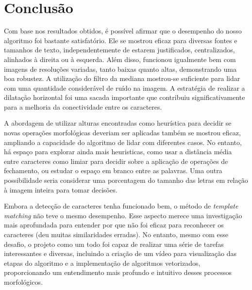 \documentclass[english, 
               brazil, 
               bsc] %
               {dcomp-abntex2}
\begin{document}
\chapter{Conclusão}

Com base nos resultados obtidos, é possível afirmar que o desempenho do nosso algoritmo foi bastante satisfatório. Ele se mostrou eficaz para diversas fontes e tamanhos de texto, independentemente de estarem justificados, centralizados, alinhados à direita ou à esquerda. Além disso, funcionou igualmente bem com imagens de resoluções variadas, tanto baixas quanto altas, demonstrando uma boa robustez. A utilização do filtro da mediana mostrou-se suficiente para lidar com uma quantidade considerável de ruído na imagem. A estratégia de realizar a dilatação horizontal foi uma sacada importante que contribuiu significativamente para a melhoria da conectividade entre os caracteres.

A abordagem de utilizar alturas encontradas como heurística para decidir se novas operações morfológicas deveriam ser aplicadas também se mostrou eficaz, ampliando a capacidade do algoritmo de lidar com diferentes casos. No entanto, há espaço para explorar ainda mais heuristicas, como usar a distância média entre caracteres como limiar para decidir sobre a aplicação de operações de fechamento, ou estudar o espaço em branco entre as palavras. Uma outra possibilidade seria considerar uma porcentagem do tamanho das letras em relação à imagem inteira para tomar decisões.

Embora a detecção de caracteres tenha funcionado bem, o método de \textit{template matching} não teve o mesmo desempenho. Esse aspecto merece uma investigação mais aprofundada para entender por que não foi eficaz para reconhecer os caracteres (deu muitas similaridades erradas). No entanto, mesmo com esse desafio, o projeto como um todo foi capaz de realizar uma série de tarefas interessantes e diversas, incluindo a criação de um vídeo para visualização das etapas do algoritmo e a implementação de algoritmos vetorizados, proporcionando um entendimento mais profundo e intuitivo desses processos morfológicos.






\postextual


\renewcommand{\chapnumfont}{\chaptitlefont}
\renewcommand{\afterchapternum}{}
% 
% 
\end{document}
